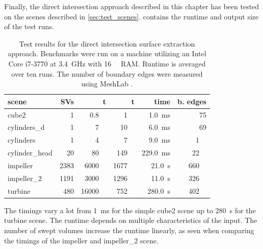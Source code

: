 Finally, the direct intersection approach described in this chapter has been tested on the scenes described in \cref{sec:test_scenes}.
 contains the runtime and output size of the test runs.
%
\begin{table}[!]
	\centering
	\begin{tabular}{lrrrrr}
		scene          & SVs  & t\sub{in} & t\sub{out} & {time} & b. edges\\
		\midrule
		cube2          &    1 & \SI{  0.8}{\kilo\nothing} & \SI{   1}{\kilo\nothing} & \SI{  1.0}{\milli\second}            & \SI{ 75}{     \nothing} \\
		cylinders\_d   &    1 & \SI{    7}{\kilo\nothing} & \SI{  10}{\kilo\nothing} & \SI{  6.0}{\milli\second}            & \SI{ 69}{     \nothing} \\
		cylinders      &    1 & \SI{    4}{\kilo\nothing} & \SI{   7}{\kilo\nothing} & \SI{  9.0}{\milli\second}            & \SI{  1}{\kilo\nothing} \\ %
		cylinder\_head &   20 & \SI{   80}{\kilo\nothing} & \SI{ 149}{\kilo\nothing} & \SI{229.0}{\milli\second}            & \SI{ 22}{\kilo\nothing} \\ %
		impeller       & 2383 & \SI{ 6000}{\kilo\nothing} & \SI{1677}{\kilo\nothing} & \SI{ 21.0}{      \second}\phantom{m} & \SI{660}{\kilo\nothing} \\ %
		impeller\_2    & 1191 & \SI{ 3000}{\kilo\nothing} & \SI{1296}{\kilo\nothing} & \SI{ 11.0}{      \second}\phantom{m} & \SI{326}{\kilo\nothing} \\ %
		turbine        &  480 & \SI{16000}{\kilo\nothing} & \SI{ 752}{\kilo\nothing} & \SI{280.0}{      \second}\phantom{m} & \SI{402}{\kilo\nothing} \\ %
	\end{tabular}
	\caption{
		Test results for the direct intersection surface extraction approach.
		Benchmarks were run on a machine utilizing an Intel Core i7-3770 at \SI{3.4}{\giga\hertz} with \SI{16}{\gibi\byte} RAM.
		Runtime is averaged over ten runs.
		The number of boundary edges were measured using MeshLab \cite{meshlab}.
	}
	\label{tbl:direct_intersection_results}
\end{table}
%
The timings vary a lot from \SI{1}{\milli\second} for the simple cube2 scene up to \SI{280}{\second} for the turbine scene.
The runtime depends on multiple characteristics of the input.
The number of swept volumes increase the runtime linearly, as seen when comparing the timings of the impeller and impeller\_2 scene.
